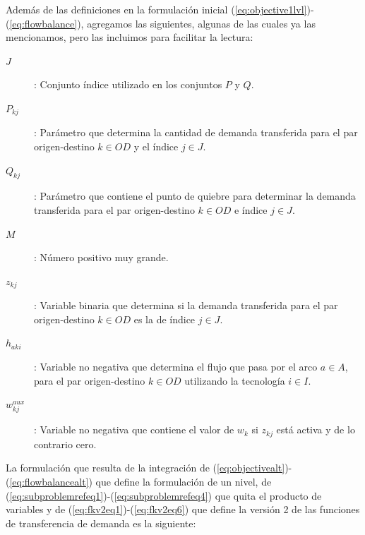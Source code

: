 Además de las definiciones en la formulación inicial (\ref{eq:objective1lvl})-(\ref{eq:flowbalance}), agregamos las siguientes, algunas de las cuales ya las mencionamos, pero las incluimos para facilitar la lectura:

\begin{description}
  \item[$J$]: Conjunto índice utilizado en los conjuntos $P$ y $Q$.
  \item[$P_{kj}$]: Parámetro que determina la cantidad de demanda transferida para el par origen-destino $k \in OD$ y el índice $j \in J$.
  \item[$Q_{kj}$]: Parámetro que contiene el punto de quiebre para determinar la demanda transferida para el par origen-destino $k \in OD$ e índice $j \in J$.
  \item[$M$]: Número positivo muy grande.
  \item[$z_{kj}$]: Variable binaria que determina si la demanda transferida para el par origen-destino $k \in OD$ es la de índice $j \in J$.
  \item[$h_{aki}$]: Variable no negativa que determina el flujo que pasa por el arco $a \in A$, para el par origen-destino $k \in OD$ utilizando la tecnología $i \in I$.
  \item[$w^{aux}_{kj}$]: Variable no negativa que contiene el valor de $w_{k}$ si $z_{kj}$ está activa y de lo contrario cero.
\end{description}

La formulación que resulta de la integración de (\ref{eq:objectivealt})-(\ref{eq:flowbalancealt}) que define la formulación de un nivel, de (\ref{eq:subproblemrefeq1})-(\ref{eq:subproblemrefeq4}) que quita el producto de variables y de (\ref{eq:fkv2eq1})-(\ref{eq:fkv2eq6}) que define la versión 2 de las funciones de transferencia de demanda es la siguiente:

